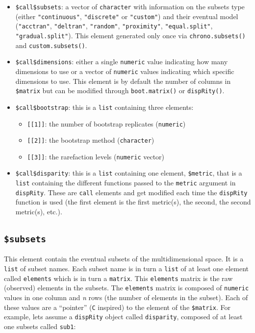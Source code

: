 \documentclass[]{book}
\providecommand{\tightlist}{%
  \setlength{\itemsep}{0pt}\setlength{\parskip}{0pt}}
\theoremstyle{definition}
\theoremstyle{definition}
\theoremstyle{definition}
\theoremstyle{remark}
\begin{document}
\begin{itemize}
\tightlist
\item
  \texttt{\$call\$subsets}: a vector of \texttt{character} with
  information on the subsets type (either \texttt{"continuous"},
  \texttt{"discrete"} or \texttt{"custom"}) and their eventual model
  (\texttt{"acctran"}, \texttt{"deltran"}, \texttt{"random"},
  \texttt{"proximity"}, \texttt{"equal.split"},
  \texttt{"gradual.split"}). This element generated only once via
  \texttt{chrono.subsets()} and \texttt{custom.subsets()}.
\item
  \texttt{\$call\$dimensions}: either a single \texttt{numeric} value
  indicating how many dimensions to use or a vector of \texttt{numeric}
  values indicating which specific dimensions to use. This element is by
  default the number of columns in \texttt{\$matrix} but can be modified
  through \texttt{boot.matrix()} or \texttt{dispRity()}.
\item
  \texttt{\$call\$bootstrap}: this is a \texttt{list} containing three
  elements:

  \begin{itemize}
  \tightlist
  \item
    \texttt{{[}{[}1{]}{]}}: the number of bootstrap replicates
    (\texttt{numeric})
  \item
    \texttt{{[}{[}2{]}{]}}: the bootstrap method (\texttt{character})
  \item
    \texttt{{[}{[}3{]}{]}}: the rarefaction levels (\texttt{numeric}
    vector)
  \end{itemize}
\item
  \texttt{\$call\$disparity}: this is a \texttt{list} containing one
  element, \texttt{\$metric}, that is a \texttt{list} containing the
  different functions passed to the \texttt{metric} argument in
  \texttt{dispRity}. These are \texttt{call} elements and get modified
  each time the \texttt{dispRity} function is used (the first element is
  the first metric(s), the second, the second metric(s), etc.).
\end{itemize}

\subsection{\texorpdfstring{\texttt{\$subsets}}{\$subsets}}\label{subsets}

This element contain the eventual subsets of the multidimensional space.
It is a \texttt{list} of subset names. Each subset name is in turn a
\texttt{list} of at least one element called \texttt{elements} which is
in turn a \texttt{matrix}. This \texttt{elements} matrix is the raw
(observed) elements in the subsets. The \texttt{elements} matrix is
composed of \texttt{numeric} values in one column and \emph{n} rows (the
number of elements in the subset). Each of these values are a
``pointer'' (\texttt{C} inspired) to the element of the
\texttt{\$matrix}. For example, lets assume a \texttt{dispRity} object
called \texttt{disparity}, composed of at least one subsets called
\texttt{sub1}:
\end{document}
